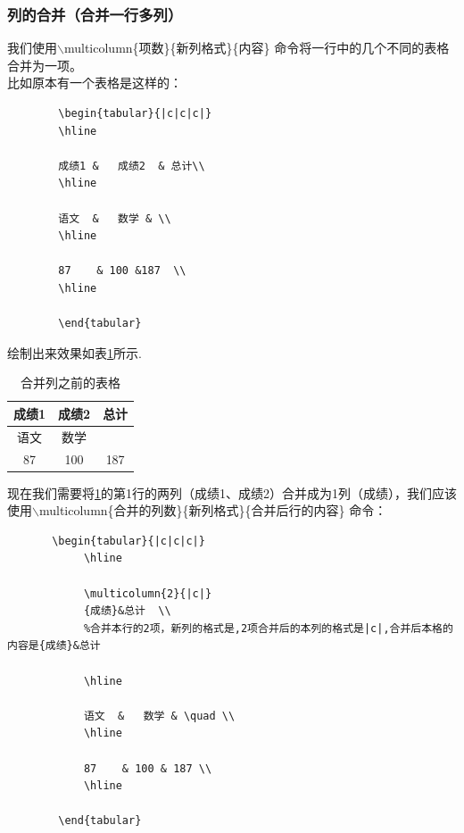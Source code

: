 \documentclass{article}
\begin{document}
\subsubsection{列的合并（合并一行多列）}
我们使用$\backslash$multicolumn\{项数\}\{新列格式\}\{内容\} 命令将一行中的几个不同的表格合并为一项。\\
比如原本有一个表格是这样的：
\begin{lstlisting}
        \begin{tabular}{|c|c|c|}
        \hline
        
        成绩1 &   成绩2  & 总计\\ 
        \hline
        
        语文  &   数学 & \\   
        \hline
        
        87    & 100 &187  \\
        \hline
        
        \end{tabular}
\end{lstlisting}
绘制出来效果如表\ref{table1}所示.
\begin{table}[H]
    \centering
    \begin{tabular}{|c|c|c|}
        \hline
        
        成绩1 &   成绩2  & 总计\\ 
        \hline
        
        语文  &   数学  & \quad \\   
        \hline
        
        87    & 100 &187  \\
        \hline
        
        \end{tabular}
    \caption{合并列之前的表格}
    \label{table1}
\end{table}

现在我们需要将\ref{table1}的第1行的两列（成绩1、成绩2）合并成为1列（成绩），我们应该使用$\backslash$multicolumn\{合并的列数\}\{新列格式\}\{合并后行的内容\} 命令：
\begin{lstlisting}
       \begin{tabular}{|c|c|c|}
            \hline
        
            \multicolumn{2}{|c|}
            {成绩}&总计  \\ 
            %合并本行的2项，新列的格式是,2项合并后的本列的格式是|c|,合并后本格的内容是{成绩}&总计
            
            \hline
        
            语文  &   数学 & \quad \\   
            \hline
            
            87    & 100 & 187 \\
            \hline
        
        \end{tabular}
\end{lstlisting}
\end{document}
